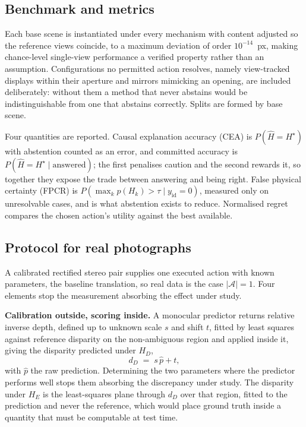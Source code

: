 \subsection{Benchmark and metrics}
\label{sec:benchmark}

Each base scene is instantiated under every mechanism with content adjusted so the
reference views coincide, to a maximum deviation of order $10^{-14}$~px, making
chance-level single-view performance a verified property rather than an assumption.
Configurations no permitted action resolves, namely view-tracked displays within
their aperture and mirrors mimicking an opening, are included deliberately: without
them a method that never abstains would be indistinguishable from one that abstains
correctly. Splits are formed by base scene.

Four quantities are reported. Causal explanation accuracy (CEA) is
$P(\hat{H} = H^\star)$ with abstention counted as an error, and committed accuracy
is $P(\hat{H} = H^\star \mid \text{answered})$; the first penalises caution and the
second rewards it, so together they expose the trade between answering and being
right. False physical certainty (FPCR) is
$P(\max_k p(H_k) > \tau \mid y_{\mathrm{id}} = 0)$, measured only on unresolvable
cases, and is what abstention exists to reduce. Normalised regret compares the
chosen action's utility against the best available.

\subsection{Protocol for real photographs}
\label{sec:real-protocol}

A calibrated rectified stereo pair supplies one executed action with known
parameters, the baseline translation, so real data is the case $|\mathcal{A}| = 1$.
Four elements stop the measurement absorbing the effect under study.

\textbf{Calibration outside, scoring inside.} A monocular predictor returns
relative inverse depth, defined up to unknown scale $s$ and shift $t$, fitted by
least squares against reference disparity on the non-ambiguous region and applied
inside it, giving the disparity predicted under $H_D$,
\begin{equation}
\label{eq:align}
d_{D} \;=\; s\,\hat{p} + t ,
\end{equation}
with $\hat{p}$ the raw prediction. Determining the two parameters where the
predictor performs well stops them absorbing the discrepancy under study. The
disparity under $H_E$ is the least-squares plane through $d_D$ over that region,
fitted to the prediction and never the reference, which would place ground truth
inside a quantity that must be computable at test time.

